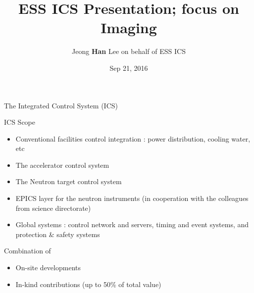 \documentclass[
  9pt
  , table
  , ignorenonframetext
]{beamer}
\title{ESS ICS Presentation; focus on Imaging}
\author{Jeong \textbf{Han} Lee on behalf of ESS ICS}%
\institute{
  Integrated Control System Division\\
  \textbf{ESS}, Sweden
}
\date{Sep 21, 2016}
\begin{document}
 
\begin{frame}[plain]
  \titlepage
\end{frame}


\begin{frame}{The Integrated Control System (ICS)}
  \begin{block}{ICS Scope}
    \begin{itemize}
    \item Conventional facilities control integration : power distribution, cooling water, etc
    \item The accelerator control system
    \item The Neutron target control system
    \item EPICS layer for the neutron instruments (in cooperation with the colleagues from science directorate)
    \item Global systems : control network and servers, timing and event systems, and protection \& safety systems
    \end{itemize}
  \end{block}
  \begin{exampleblock}{Combination of}
    \begin{itemize}
    \item On-site developments 
    \item In-kind contributions (up to 50\% of total value)
    \end{itemize}
  \end{exampleblock}
\end{frame}
\end{document}

